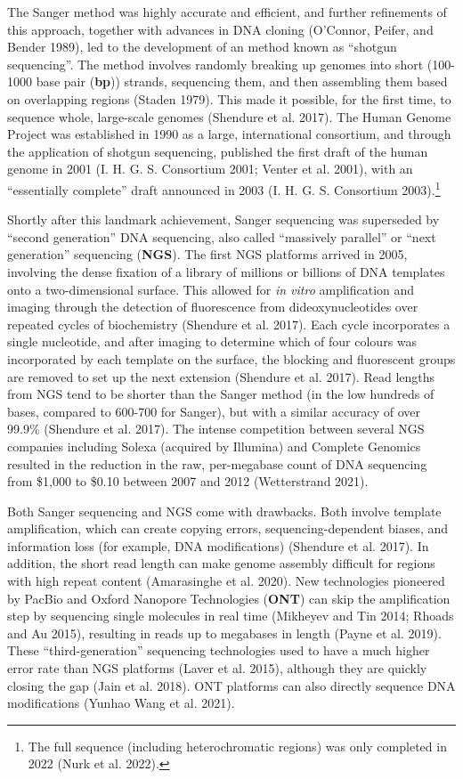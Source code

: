 \documentclass[
]{book}
\begin{document}
The Sanger method was highly accurate and efficient, and further refinements of this approach, together with advances in DNA cloning (O'Connor, Peifer, and Bender 1989), led to the development of an method known as ``shotgun sequencing''. The method involves randomly breaking up genomes into short (100-1000 base pair (\textbf{bp})) strands, sequencing them, and then assembling them based on overlapping regions (Staden 1979). This made it possible, for the first time, to sequence whole, large-scale genomes (Shendure et al. 2017). The Human Genome Project was established in 1990 as a large, international consortium, and through the application of shotgun sequencing, published the first draft of the human genome in 2001 (I. H. G. S. Consortium 2001; Venter et al. 2001), with an ``essentially complete'' draft announced in 2003 (I. H. G. S. Consortium 2003).\footnote{The full sequence (including heterochromatic regions) was only completed in 2022 (Nurk et al. 2022).}

Shortly after this landmark achievement, Sanger sequencing was superseded by ``second generation'' DNA sequencing, also called ``massively parallel'' or ``next generation'' sequencing (\textbf{NGS}). The first NGS platforms arrived in 2005, involving the dense fixation of a library of millions or billions of DNA templates onto a two-dimensional surface. This allowed for \emph{in vitro} amplification and imaging through the detection of fluorescence from dideoxynucleotides over repeated cycles of biochemistry (Shendure et al. 2017). Each cycle incorporates a single nucleotide, and after imaging to determine which of four colours was incorporated by each template on the surface, the blocking and fluorescent groups are removed to set up the next extension (Shendure et al. 2017). Read lengths from NGS tend to be shorter than the Sanger method (in the low hundreds of bases, compared to 600-700 for Sanger), but with a similar accuracy of over 99.9\% (Shendure et al. 2017). The intense competition between several NGS companies including Solexa (acquired by Illumina) and Complete Genomics resulted in the reduction in the raw, per-megabase count of DNA sequencing from \$1,000 to \$0.10 between 2007 and 2012 (Wetterstrand 2021).

Both Sanger sequencing and NGS come with drawbacks. Both involve template amplification, which can create copying errors, sequencing-dependent biases, and information loss (for example, DNA modifications) (Shendure et al. 2017). In addition, the short read length can make genome assembly difficult for regions with high repeat content (Amarasinghe et al. 2020). New technologies pioneered by PacBio and Oxford Nanopore Technologies (\textbf{ONT}) can skip the amplification step by sequencing single molecules in real time (Mikheyev and Tin 2014; Rhoads and Au 2015), resulting in reads up to megabases in length (Payne et al. 2019). These ``third-generation'' sequencing technologies used to have a much higher error rate than NGS platforms (Laver et al. 2015), although they are quickly closing the gap (Jain et al. 2018). ONT platforms can also directly sequence DNA modifications (Yunhao Wang et al. 2021).
\end{document}
